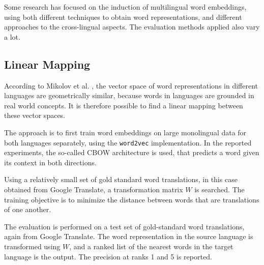 Some research has focused on the induction of multilingual word embeddings, using both different techniques to obtain word representations, and different approaches to the cross-lingual aspects. The evaluation methods applied also vary a lot.


\subsection{Linear Mapping}\label{s:lin}

According to Mikolov et al. \cite{mikolov2013exploiting}, the vector space of word representations in different languages are geometrically similar, because words in languages are grounded in real world concepts.
It is therefore possible to find a linear mapping 
between these vector spaces.

The approach is to first train word embeddings on large monolingual data for both languages separately, using the \texttt{word2vec} implementation. In the reported experiments, the so-called CBOW architecture is used, that predicts a word given its context in both directions.

Using a relatively small set of gold standard word translations, in this case obtained from Google Translate, a transformation matrix $W$ is searched. The training objective is to minimize the distance between words that are translations of one another.

The evaluation is performed on a test set of gold-standard word translations, again from Google Translate. The word representation in the source language is transformed using $W$, and a ranked list of the nearest words in the target language is the output. The precision at ranks 1 and 5 is reported.


